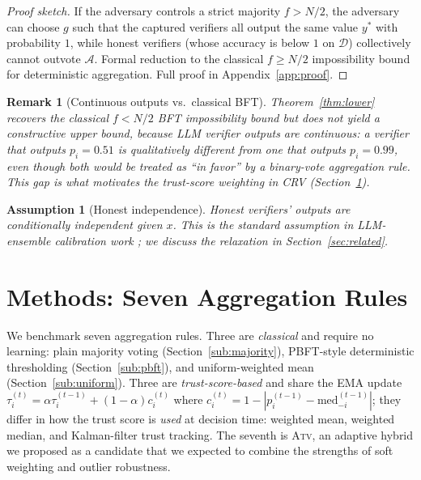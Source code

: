 \documentclass[11pt]{article}
\newtheorem{remark}{Remark}
\newtheorem{assumption}{Assumption}
\newcommand{\A}{\mathcal{A}}            %
\begin{document}
\begin{proof}[Proof sketch]
If the adversary controls a strict majority $f > N/2$, the adversary can
choose $g$ such that the captured verifiers all output the same value $y^*$
with probability $1$, while honest verifiers (whose accuracy is below $1$
on $\mathcal{D}$) collectively cannot outvote $\A$. Formal reduction to
the classical $f \geq N/2$ impossibility bound for deterministic
aggregation. Full proof in Appendix~\ref{app:proof}.
\end{proof}

\begin{remark}[Continuous outputs vs.\ classical BFT]
Theorem~\ref{thm:lower} recovers the classical $f < N/2$ BFT impossibility
bound but does not yield a constructive upper bound, because LLM verifier
outputs are continuous: a verifier that outputs $p_i = 0.51$ is
qualitatively different from one that outputs $p_i = 0.99$, even though
both would be treated as ``in favor'' by a binary-vote aggregation rule.
This gap is what motivates the trust-score weighting in \textsc{CRV}
(Section~\ref{sec:method}).
\end{remark}

\begin{assumption}[Honest independence]
\label{ass:indep}
Honest verifiers' outputs are conditionally independent given $x$. This
is the standard assumption in LLM-ensemble calibration work
\citep{cui2026edo,zheng2023judging}; we discuss the relaxation in
Section~\ref{sec:related}.
\end{assumption}

\section{Methods: Seven Aggregation Rules}
\label{sec:method}

We benchmark seven aggregation rules. Three are \emph{classical} and
require no learning: plain majority voting
(Section~\ref{sub:majority}), PBFT-style deterministic thresholding
(Section~\ref{sub:pbft}), and uniform-weighted mean
(Section~\ref{sub:uniform}). Three are \emph{trust-score-based} and
share the EMA update
$\tau_i^{(t)} = \alpha \tau_i^{(t-1)} + (1-\alpha) c_i^{(t)}$ where
$c_i^{(t)} = 1 - |p_i^{(t-1)} - \text{med}_{-i}^{(t-1)}|$; they differ
in how the trust score is \emph{used} at decision time: weighted mean,
weighted median, and Kalman-filter trust tracking. The seventh is
\textsc{Atv}, an adaptive hybrid we proposed as a candidate that we
expected to combine the strengths of soft weighting and outlier
robustness.
\end{document}
